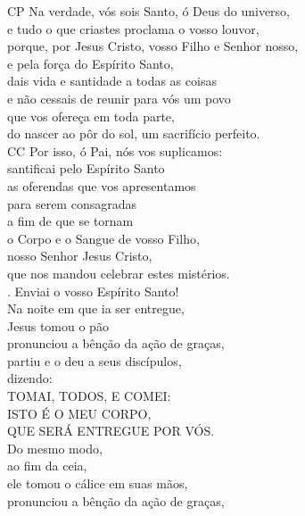 \documentclass{book}
\begin{document}
\begin{flushleft}
    {\color{VioletRed2}CP} Na verdade, vós sois Santo, ó Deus do universo, \\
    e tudo o que criastes proclama o vosso louvor, \\
    porque, por Jesus Cristo, vosso Filho e Senhor nosso, \\
    e pela força do Espírito Santo, \\
    dais vida e santidade a todas as coisas \\
    e não cessais de reunir para vós um povo \\
    que vos ofereça em toda parte, \\
    do nascer ao pôr do sol, um sacrifício perfeito.
    \vspace{.2cm} \\
    {\color{VioletRed2}CC} Por isso, ó Pai, nós vos suplicamos: \\
    santificai pelo Espírito Santo \\
    as oferendas que vos apresentamos \\
    para serem consagradas \\
    a fim de que se tornam \\
    o Corpo e \grecrossRed{} o Sangue de vosso Filho, \\
    nosso Senhor Jesus Cristo, \\
    que nos mandou celebrar estes mistérios.
    \vspace{.2cm} \\
    {\color{VioletRed2} \Rbar.} Enviai o vosso Espírito Santo!
    \vspace{.2cm} \\
    Na noite em que ia ser entregue, \\
    Jesus tomou o pão \\
    pronunciou a bênção da ação de graças, \\
    partiu e o deu a seus discípulos, \\
    dizendo:
    \vspace{.2cm} \\
    TOMAI, TODOS, E COMEI: \\
    ISTO É O MEU CORPO, \\
    QUE SERÁ ENTREGUE POR VÓS.
    \vspace{.2cm} \\
    Do mesmo modo, \\
    ao fim da ceia, \\
    ele tomou o cálice em suas mãos, \\
    pronunciou a bênção da ação de graças, \\

\end{flushleft}
\end{document}
